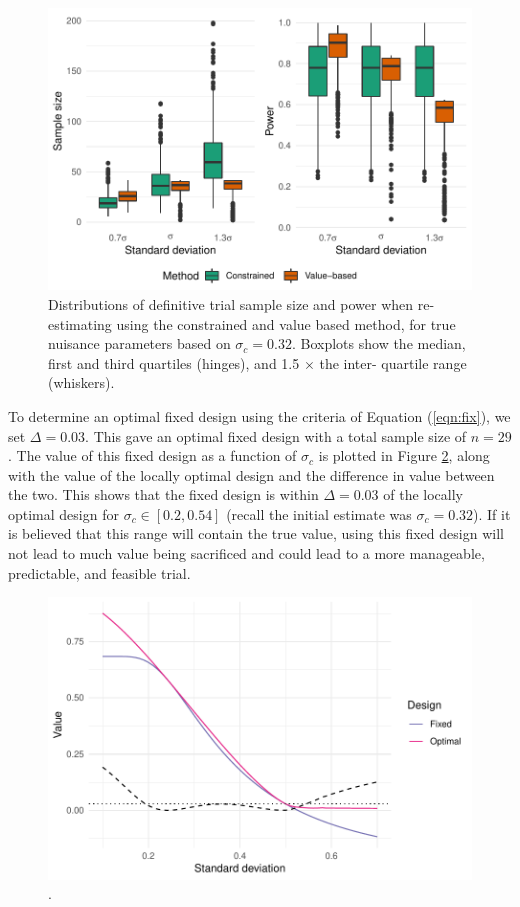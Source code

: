 \documentclass[sagev, Crown]{sagej}
\begin{document}
\begin{figure}
\centering
\includegraphics[scale=0.8]{./figures/dists_t_test}
\caption{Distributions of definitive trial sample size and power when re-estimating using the constrained and value based method, for true nuisance parameters based on $\sigma_c = 0.32$.  Boxplots show the median, first and third quartiles (hinges), and 1.5 $\times$ the inter- quartile range (whiskers).}
\label{fig:dists_t_test}
\end{figure}


To determine an optimal fixed design using the criteria of Equation (\ref{eqn:fix}), we set $\Delta = 0.03$. This gave an optimal fixed design with a total sample size of $n = 29$. The value of this fixed design as a function of $\sigma_c$ is plotted in Figure \ref{fig:fixed_t_test}, along with the value of the locally optimal design and the difference in value between the two. This shows that the fixed design is within $\Delta = 0.03$ of the locally optimal design for $\sigma_c \in [0.2, 0.54]$ (recall the initial estimate was $\sigma_c = 0.32$). If it is believed that this range will contain the true value, using this fixed design will not lead to much value being sacrificed and could lead to a more manageable, predictable, and feasible trial.

\begin{figure}
\centering
\includegraphics[scale=0.8]{./figures/fixed_t_test}
\caption{.}
\label{fig:fixed_t_test}
\end{figure}
\end{document}
